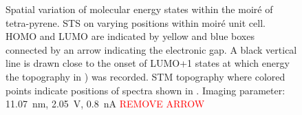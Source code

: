 \begin{figure}[] \centering
	\caption{Spatial variation of molecular energy states within the moir\'e of tetra-pyrene.  STS on varying positions within moir\'e unit cell. HOMO and LUMO are indicated by yellow and blue boxes connected by an arrow indicating the electronic gap. A black vertical line is drawn close to the onset of LUMO+1 states at which energy the topography in ) was recorded.  STM topography where colored points indicate positions of spectra shown in . Imaging parameter: \SI{11.07}{\nano \meter}, \SI{2.05}{\volt}, \SI{0.8}{\nano \ampere} \textcolor{red}{REMOVE ARROW}}
	\label{fig:pyrene-fig4}
\end{figure}

